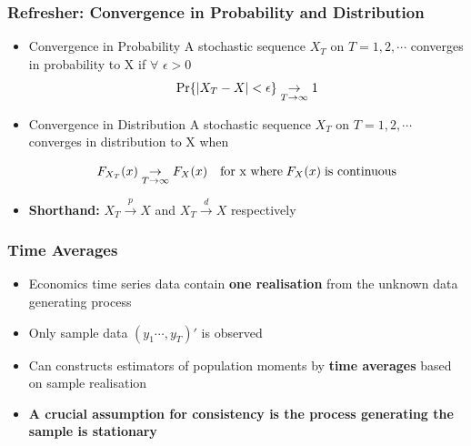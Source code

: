 \documentclass{beamer}
\begin{document}
		\begin{frame}
		\frametitle{Refresher: Convergence in Probability and Distribution}
		\begin{itemize}
		\item[]	\begin{mydef*}[width=14cm]{Convergence in Probability} A stochastic sequence $X_T$ on $T=1,2,\cdots$ converges in probability to X if  $\forall$ $\epsilon>0$
			\begin{equation*}\Pr\{|X_T-X|<\epsilon\} \underset{\tiny T\rightarrow \infty}{\rightarrow} 1 \end{equation*} \end{mydef*}
				\vspace{15pt}
		\pause 
			\item[]	\begin{mydef*}[width=14cm]{Convergence in Distribution} A stochastic sequence $X_T$ on $T=1,2,\cdots$ converges in distribution to X when
				
				\begin{equation*} F_{X_T}(x) \underset{\tiny T\rightarrow \infty}{\rightarrow} F_X(x)  \quad \textrm{for x where} \; F_X(x) \; \textrm{is continuous} \end{equation*}  \end{mydef*}
				\vspace{20pt}
			\pause
			\item[] \textbf{Shorthand:} $X_T\overset{p}{\rightarrow} X$ and $X_T\overset{d}{\rightarrow} X$ respectively
	\end{itemize}
\end{frame}	
	\begin{frame}
		\frametitle{Time Averages}
		\begin{itemize}
			\item[] Economics time series data contain \textbf{one realisation} from the unknown data generating process
			\vspace{10pt}
			\pause 
			\item[] \hspace{12pt} Only sample data $(y_1\cdots,y_T)'$ is observed
			\vspace{15pt}
			\pause 
		
			\item[] Can constructs estimators of population moments by \textbf{time averages} based on sample realisation
				\vspace{15pt}
			\pause 
			
			
			
			
			\item[] \textbf{A crucial assumption for consistency is the process generating the sample is stationary}
			
			
			
			
				
		\end{itemize}
	\end{frame}
\end{document}
